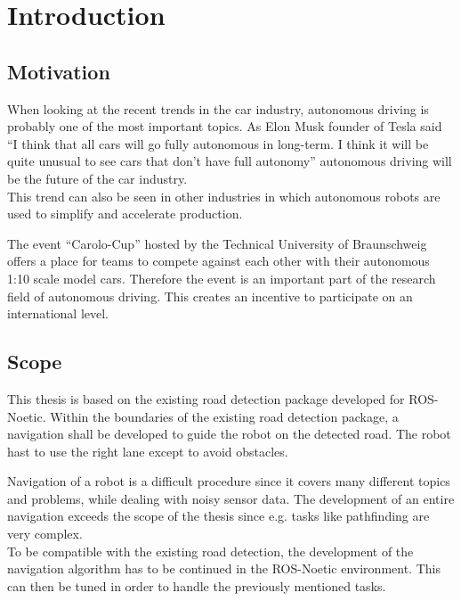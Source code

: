 \chapter{Introduction}
\label{introduction}


\section{Motivation}
When looking at the recent trends in the car industry, autonomous driving is probably one of the most important topics. As Elon Musk founder of Tesla said ``I think that all cars will go fully autonomous in long-term. I think it will be quite unusual to see cars that don’t have full autonomy'' autonomous driving will be the future of the car industry\cite{musk}.\\

This trend can also be seen in other industries in which autonomous robots are used to simplify and accelerate production. 

The event ``Carolo-Cup'' hosted by the Technical University of Braunschweig offers a place for teams to compete against each other with their autonomous 1:10 scale model cars. Therefore the event is an important part of the research field of autonomous driving. This creates an incentive to participate on an international level.

\section{Scope}


This thesis is based on the existing road detection package developed for ROS-Noetic. Within the boundaries of the existing road detection package, a navigation shall be developed to guide the robot on the detected road. The robot hast to use the right lane except to avoid obstacles.

Navigation of a robot is a difficult procedure since it covers many different topics and problems, while dealing with noisy sensor data. The development of an entire navigation exceeds the scope of the thesis since e.g. tasks like pathfinding are very complex.\\

To be compatible with the existing road detection, the development of the navigation algorithm has to be continued in the ROS-Noetic environment. This can then be tuned in order to handle the previously mentioned tasks.\\

